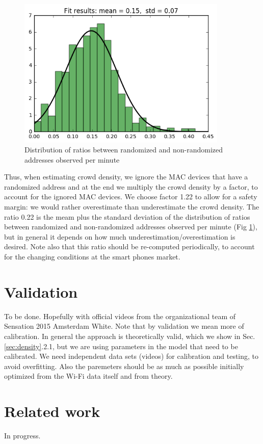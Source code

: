 \documentclass[10pt,a4paper]{article}
\begin{document}
\begin{figure}[h!]
	\centering
	\includegraphics[width=100mm]{ratio_hist.png}
	\caption{Distribution of ratios between randomized and non-randomized addresses observed per minute}
	\label{fig:ratio_dist}
\end{figure} 

\noindent Thus, when estimating crowd density, we ignore the MAC devices that have a randomized address and at the end we multiply the crowd density by a factor, to account for the ignored MAC devices. We choose factor 1.22 to allow for a safety margin: we would rather overestimate than underestimate the crowd density. The ratio  0.22 is the meam plus the standard deviation of the distribution of ratios between randomized and non-randomized addresses observed per minute (Fig \ref{fig:ratio_dist}), but in general it depends on how much underestimation/overestimation is desired. Note also that this ratio should be re-computed periodically, to account for the changing conditions at the smart phones market. 




\section{Validation}\label{sec:validation}
To be done.
Hopefully with official videos from the organizational team of  Sensation 2015 Amsterdam White.
Note that by validation we mean more of calibration. In general the approach is theoretically valid, which we show in Sec.\ref{sec:density}.2.1, but we are using parameters in the model that need to be calibrated. We need independent data sets (videos) for calibration and testing, to avoid overfitting. Also the paremeters should be as much as possible initially optimized from the Wi-Fi data itself and from theory.

\section{Related work}\label{sec:relatedwork}
In progress. 
\end{document}
